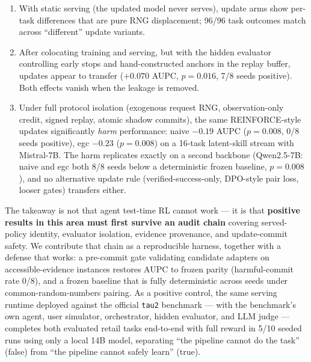 \begin{enumerate}
\item[F1.] With static serving (the updated model never serves), update
  arms show per-task differences that are pure RNG displacement;
  96/96 task outcomes match across ``different'' update variants.
\item[F2.] After colocating training and serving, but with the hidden
  evaluator controlling early stops and hand-constructed anchors in the
  replay buffer, updates appear to transfer ($+0.070$ AUPC,
  $p{=}0.016$, 7/8 seeds positive). Both effects vanish when the
  leakage is removed.
\item[F3.] Under full protocol isolation (exogenous request RNG,
  observation-only credit, signed replay, atomic shadow commits), the
  same REINFORCE-style updates significantly \emph{harm} performance:
  naive $-0.19$ AUPC ($p{=}0.008$, 0/8 seeds positive), egc $-0.23$
  ($p{=}0.008$) on a 16-task latent-skill stream with Mistral-7B.
  The harm replicates exactly on a second backbone (Qwen2.5-7B:
  naive and egc both 8/8 seeds below a deterministic frozen baseline,
  $p{=}0.008$), and no alternative update rule (verified-success-only,
  DPO-style pair loss, looser gates) transfers either.
\end{enumerate}

The takeaway is not that agent test-time RL cannot work --- it is that
\textbf{positive results in this area must first survive an audit
chain} covering served-policy identity, evaluator isolation, evidence
provenance, and update-commit safety. We contribute that chain as a
reproducible harness, together with a defense that works: a pre-commit
gate validating candidate adapters on accessible-evidence instances
restores AUPC to frozen parity (harmful-commit rate 0/8), and a
frozen baseline that is fully deterministic across seeds under
common-random-numbers pairing. As a positive control, the same serving
runtime deployed against the official \texttt{tau2} benchmark --- with
the benchmark's own agent, user simulator, orchestrator, hidden
evaluator, and LLM judge --- completes both evaluated retail tasks
end-to-end with full reward in 5/10 seeded runs using only a local 14B
model, separating ``the pipeline cannot do the task'' (false) from
``the pipeline cannot safely learn'' (true).
